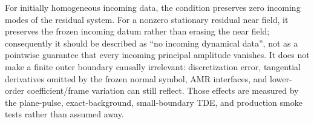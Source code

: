 \documentclass[11pt]{article}
\begin{document}
For initially homogeneous incoming data, the condition preserves zero
incoming modes of the residual system.  For a nonzero stationary residual
near field, it preserves the frozen incoming datum rather than erasing the
near field; consequently it should be described as ``no incoming dynamical
data'', not as a pointwise guarantee that every incoming principal amplitude
vanishes.  It does not make a finite outer boundary causally irrelevant:
discretization error, tangential derivatives omitted by the frozen normal
symbol, AMR interfaces, and lower-order coefficient/frame variation can still
reflect.  Those effects are measured by the plane-pulse, exact-background,
small-boundary TDE, and production smoke tests rather than assumed away.
\end{document}
